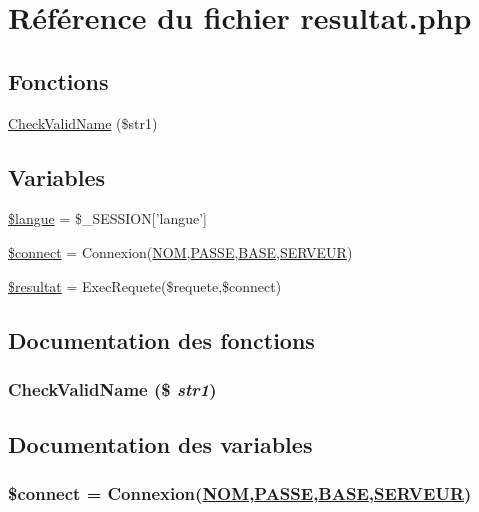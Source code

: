 \hypertarget{resultat_8php}{
\section{R\'{e}f\'{e}rence du fichier resultat.php}
\label{resultat_8php}
}
\subsection*{Fonctions}
\begin{CompactItemize}
\item 
\hyperlink{resultat_8php_a3}{Check\-Valid\-Name} (\$str1)
\end{CompactItemize}
\subsection*{Variables}
\begin{CompactItemize}
\item 
\hyperlink{resultat_8php_a0}{\$langue} = \$\_\-SESSION\mbox{[}'langue'\mbox{]}
\item 
\hyperlink{resultat_8php_a1}{\$connect} = Connexion(\hyperlink{pma__connect_8php_a0}{NOM},\hyperlink{pma__connect_8php_a1}{PASSE},\hyperlink{pma__connect_8php_a3}{BASE},\hyperlink{pma__connect_8php_a2}{SERVEUR})
\item 
\hyperlink{resultat_8php_a2}{\$resultat} = Exec\-Requete(\$requete,\$connect)
\end{CompactItemize}


\subsection{Documentation des fonctions}
\hypertarget{resultat_8php_a3}{
\subsubsection[CheckValidName]{\setlength{\rightskip}{0pt plus 5cm}Check\-Valid\-Name (\$ {\em str1})}}
\label{resultat_8php_a3}




\subsection{Documentation des variables}
\hypertarget{resultat_8php_a1}{
\subsubsection[\$connect]{\setlength{\rightskip}{0pt plus 5cm}\$connect = Connexion(\hyperlink{pma__connect_8php_a0}{NOM},\hyperlink{pma__connect_8php_a1}{PASSE},\hyperlink{pma__connect_8php_a3}{BASE},\hyperlink{pma__connect_8php_a2}{SERVEUR})}}
\label{resultat_8php_a1}


